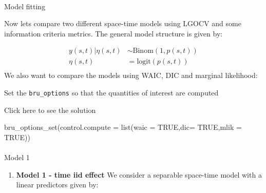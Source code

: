 \documentclass[
  letterpaper,
  DIV=11,
  numbers=noendperiod]{scrartcl}
\makeatletter
\let\oldparagraph\paragraph
\renewcommand{\paragraph}{
    \@ifstar
      \xxxParagraphStar
      \xxxParagraphNoStar
  }
\newcommand{\xxxParagraphStar}[1]{\oldparagraph*{#1}\mbox{}}
\newcommand{\xxxParagraphNoStar}[1]{\oldparagraph{#1}\mbox{}}
\newenvironment{Shaded}{\begin{snugshade}}{\end{snugshade}}
\newcommand{\AttributeTok}[1]{\textcolor[rgb]{0.40,0.45,0.13}{#1}}
\newcommand{\ConstantTok}[1]{\textcolor[rgb]{0.56,0.35,0.01}{#1}}
\newcommand{\FunctionTok}[1]{\textcolor[rgb]{0.28,0.35,0.67}{#1}}
\newcommand{\NormalTok}[1]{\textcolor[rgb]{0.00,0.23,0.31}{#1}}
\providecommand{\tightlist}{%
  \setlength{\itemsep}{0pt}\setlength{\parskip}{0pt}}
\makeatother
\begin{document}
\paragraph{Model fitting}\label{model-fitting}

Now lets compare two different space-time models using LGOCV and some
information criteria metrics. The general model structure is given by:

\[
\begin{aligned}
y(s,t)|\eta(s,t)&\sim\text{Binom}(1, p(s,t))\\
\eta(s,t) &= \text{logit}(p(s,t)) \\
\end{aligned}
\] We also want to compare the models using WAIC, DIC and marginal
likelihood:

\begin{tcolorbox}[enhanced jigsaw, rightrule=.15mm, breakable, colbacktitle=quarto-callout-warning-color!10!white, arc=.35mm, opacityback=0, opacitybacktitle=0.6, bottomtitle=1mm, left=2mm, colframe=quarto-callout-warning-color-frame, toptitle=1mm, titlerule=0mm, title={Task}, toprule=.15mm, bottomrule=.15mm, leftrule=.75mm, coltitle=black, colback=white]

Set the \texttt{bru\_options} so that the quantities of interest are
computed

Click here to see the solution

\begin{Shaded}
\begin{Highlighting}[]
\FunctionTok{bru\_options\_set}\NormalTok{(}\AttributeTok{control.compute =} \FunctionTok{list}\NormalTok{(}\AttributeTok{waic =} \ConstantTok{TRUE}\NormalTok{,}\AttributeTok{dic=} \ConstantTok{TRUE}\NormalTok{,}\AttributeTok{mlik =} \ConstantTok{TRUE}\NormalTok{))}
\end{Highlighting}
\end{Shaded}

\end{tcolorbox}

\paragraph{Model 1}\label{model-1}

\begin{enumerate}
\def\labelenumi{\arabic{enumi}.}
\tightlist
\item
  \textbf{Model 1 - time iid effect} We consider a separable space-time
  model with a linear predictors given by:
\end{enumerate}
\end{document}
